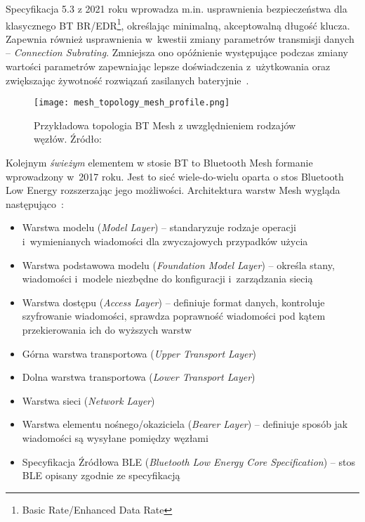 Specyfikacja 5.3 z 2021 roku wprowadza m.in. usprawnienia bezpieczeństwa dla klasycznego BT BR/EDR\footnote{Basic Rate/Enhanced Data Rate}, określając
minimalną, akceptowalną długość klucza. Zapewnia również usprawnienia w~kwestii zmiany parametrów transmisji
danych -- \textit{Connection Subrating}. Zmniejsza ono opóźnienie występujące podczas zmiany wartości parametrów
zapewniając lepsze doświadczenia z~użytkowania oraz zwiększając żywotność rozwiązań zasilanych 
bateryjnie~\cite{woolley_bluetooth_2021}.

\begin{figure}[!ht]
	\centering \texttt{[image: mesh\_topology\_mesh\_profile.png]}
	\caption{Przykładowa topologia BT Mesh z uwzględnieniem rodzajów węzłów. Źródło:~\cite{mesh_working_group_mesh_2019}}
	\label{rys:mesh_topology_mesh_profile}
\end{figure}

Kolejnym \textit{świeżym} elementem w stosie BT to Bluetooth Mesh formanie wprowadzony
w~2017 roku. Jest to sieć wiele-do-wielu oparta o stos Bluetooth Low Energy
rozszerzając jego możliwości. Architektura warstw Mesh wygląda następująco~\cite{mesh_working_group_mesh_2019}:
\begin{itemize}
\item Warstwa modelu (\textit{Model Layer}) -- standaryzuje rodzaje operacji i~wymienianych wiadomości dla zwyczajowych przypadków użycia
\item Warstwa podstawowa modelu (\textit{Foundation Model Layer}) -- określa stany, wiadomości i~modele niezbędne do konfiguracji i~zarządzania siecią
\item Warstwa dostępu (\textit{Access Layer}) -- definiuje format danych, kontroluje szyfrowanie wiadomości, sprawdza poprawność wiadomości
pod kątem przekierowania ich do wyższych warstw
\item Górna warstwa transportowa (\textit{Upper Transport Layer})
\item Dolna warstwa transportowa (\textit{Lower Transport Layer})
\item Warstwa sieci (\textit{Network Layer})
\item Warstwa elementu nośnego/okaziciela (\textit{Bearer Layer}) -- definiuje sposób jak wiadomości są wysyłane pomiędzy węzłami
\item Specyfikacja Źródłowa BLE (\textit{Bluetooth Low Energy Core Specification}) -- stos BLE opisany zgodnie ze specyfikacją
\end{itemize}

